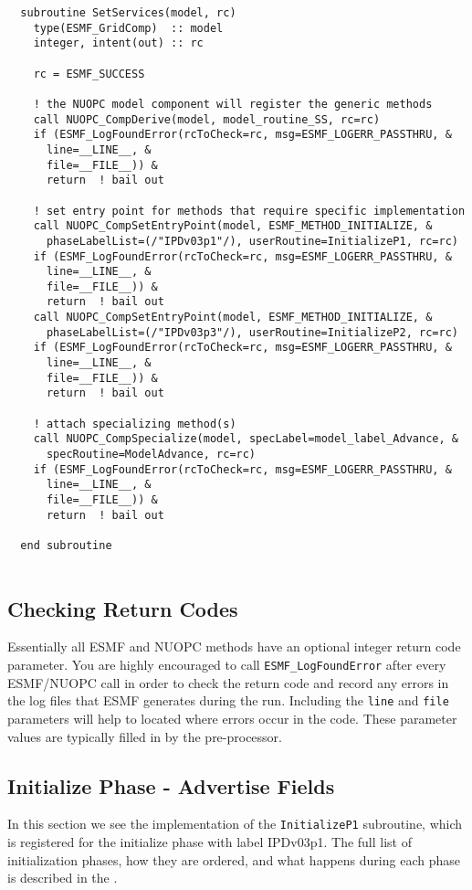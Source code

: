  \begin{verbatim}
  subroutine SetServices(model, rc)
    type(ESMF_GridComp)  :: model
    integer, intent(out) :: rc
    
    rc = ESMF_SUCCESS
    
    ! the NUOPC model component will register the generic methods
    call NUOPC_CompDerive(model, model_routine_SS, rc=rc)
    if (ESMF_LogFoundError(rcToCheck=rc, msg=ESMF_LOGERR_PASSTHRU, &
      line=__LINE__, &
      file=__FILE__)) &
      return  ! bail out
    
    ! set entry point for methods that require specific implementation
    call NUOPC_CompSetEntryPoint(model, ESMF_METHOD_INITIALIZE, &
      phaseLabelList=(/"IPDv03p1"/), userRoutine=InitializeP1, rc=rc)
    if (ESMF_LogFoundError(rcToCheck=rc, msg=ESMF_LOGERR_PASSTHRU, &
      line=__LINE__, &
      file=__FILE__)) &
      return  ! bail out
    call NUOPC_CompSetEntryPoint(model, ESMF_METHOD_INITIALIZE, &
      phaseLabelList=(/"IPDv03p3"/), userRoutine=InitializeP2, rc=rc)
    if (ESMF_LogFoundError(rcToCheck=rc, msg=ESMF_LOGERR_PASSTHRU, &
      line=__LINE__, &
      file=__FILE__)) &
      return  ! bail out
    
    ! attach specializing method(s)
    call NUOPC_CompSpecialize(model, specLabel=model_label_Advance, &
      specRoutine=ModelAdvance, rc=rc)
    if (ESMF_LogFoundError(rcToCheck=rc, msg=ESMF_LOGERR_PASSTHRU, &
      line=__LINE__, &
      file=__FILE__)) &
      return  ! bail out
    
  end subroutine
 
\end{verbatim}
 

  \subsection{Checking Return Codes}
  \label{sec:atmexample_retcodes}
   Essentially all ESMF and NUOPC methods have an optional integer
   return code parameter.  You are highly encouraged to call
   {\tt ESMF\_LogFoundError} after every ESMF/NUOPC call in order to
   check the return code and record any errors in the log files
   that ESMF generates during the run.  Including the {\tt line} and
   {\tt file} parameters will help to located where errors occur in the code.
   These parameter values are typically filled in by the pre-processor.
  
  \subsection{Initialize Phase - Advertise Fields}
  \label{sec:atmexample_advertisefields}
   In this section we see the implementation of the {\tt InitializeP1} subroutine, which
   is registered for the initialize phase with label IPDv03p1.
   The full list of initialization phases,
   how they are ordered, and what happens during each phase is described in the
   .
  

